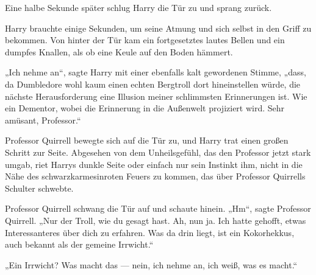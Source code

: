 \later

Eine halbe Sekunde später schlug Harry die Tür zu und sprang zurück.

Harry brauchte einige Sekunden, um seine Atmung und sich selbst in den Griff zu bekommen. Von hinter der Tür kam ein fortgesetztes lautes Bellen und ein dumpfes Knallen, als ob eine Keule auf den Boden hämmert.

„Ich nehme an“, sagte Harry mit einer ebenfalls kalt gewordenen Stimme, „dass, da Dumbledore wohl kaum einen echten Bergtroll dort hineinstellen würde, die nächste Herausforderung eine Illusion meiner schlimmsten Erinnerungen ist. Wie ein Dementor, wobei die Erinnerung in die Außenwelt projiziert wird. Sehr amüsant, Professor.“

Professor Quirrell bewegte sich auf die Tür zu, und Harry trat einen großen Schritt zur Seite. Abgesehen von dem Unheilsgefühl, das den Professor jetzt stark umgab, riet Harrys dunkle Seite oder einfach nur sein Instinkt ihm, nicht in die Nähe des schwarzkarmesinroten Feuers zu kommen, das über Professor Quirrells Schulter schwebte.

Professor Quirrell schwang die Tür auf und schaute hinein.
„Hm“, sagte Professor Quirrell.
„Nur der Troll, wie du gesagt hast. Ah, nun ja. Ich hatte gehofft, etwas Interessanteres über dich zu erfahren. Was da drin liegt, ist ein Kokorhekkus, auch bekannt als der gemeine Irrwicht.“

„Ein Irrwicht? Was macht das — nein, ich nehme an, ich weiß, was es macht.“

